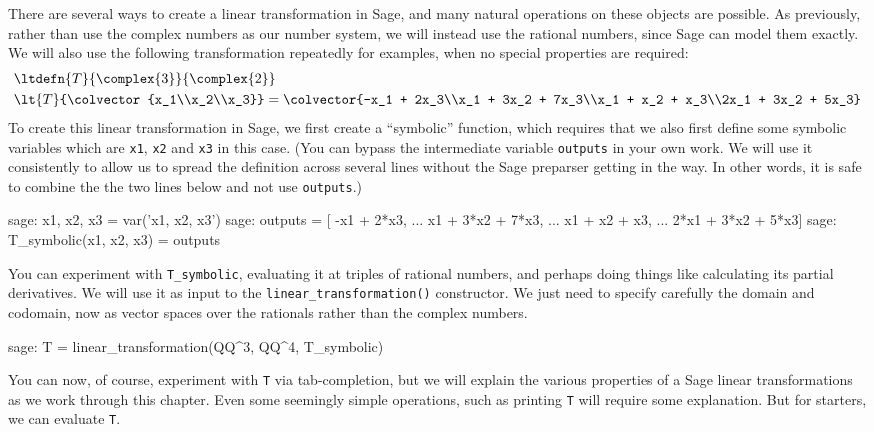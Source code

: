 There are several ways to create a linear transformation in Sage, and many natural operations on these objects are possible.  As previously, rather than use the complex numbers as our number system, we will instead use the rational numbers, since Sage can model them exactly.  We will also use the following transformation repeatedly for examples, when no special properties are required:
%
\begin{align*}
&\ltdefn{T}{\complex{3}}{\complex{2}}\\
&\lt{T}{\colvector{x_1\\x_2\\x_3}}=\colvector{-x_1 + 2x_3\\x_1 + 3x_2 + 7x_3\\x_1 + x_2 + x_3\\2x_1 + 3x_2 + 5x_3}
\end{align*}
%
To create this linear transformation in Sage, we first create a ``symbolic'' function, which requires that we also first define some symbolic variables which are \verb?x1?, \verb?x2? and \verb?x3? in this case.  (You can bypass the intermediate variable \verb?outputs? in your own work.  We will use it consistently to allow us to spread the definition across several lines without the Sage preparser getting in the way.  In other words, it is safe to combine the the two lines below and not use \verb?outputs?.)
%
\begin{sageexample}
sage: x1, x2, x3 = var('x1, x2, x3')
sage: outputs = [ -x1        + 2*x3,
...                x1 + 3*x2 + 7*x3,
...                x1 +   x2 +   x3,
...              2*x1 + 3*x2 + 5*x3]
sage: T_symbolic(x1, x2, x3) = outputs
\end{sageexample}
%
You can experiment with \verb?T_symbolic?, evaluating it at triples of rational numbers, and perhaps doing things like calculating its partial derivatives.  We will use it as input to the \verb?linear_transformation()? constructor.  We just need to specify carefully the domain and codomain, now as vector spaces over the rationals rather than the complex numbers.
%
\begin{sageexample}
sage: T = linear_transformation(QQ^3, QQ^4, T_symbolic)
\end{sageexample}
%
You can now, of course, experiment with \verb?T? via tab-completion, but we will explain the various properties of a Sage linear transformations as we work through this chapter.  Even some seemingly simple operations, such as printing \verb?T? will require some explanation.  But for starters, we can evaluate \verb?T?.
